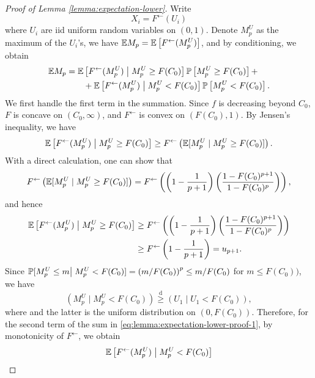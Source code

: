 \begin{proof}[Proof of Lemma \ref{lemma:expectation-lower}]
Write 
$$
X_i = F^{\leftarrow}(U_i)
$$
where $U_i$ are iid uniform random variables on $(0,1)$.
Denote $M^{U}_p$ as the maximum of the $U_i$'s, we have $\E M_p = \E\left[F^{\leftarrow}(M^{U}_p)\right]$, and by conditioning, we obtain
\begin{align} \label{eq:lemma:expectation-lower-proof-1}
    \E M_p &= \E\left[F^{\leftarrow}(M^{U}_p)\;\big|\;M^{U}_p \ge F(C_0)\right] \P\left[M^{U}_p \ge F(C_0)\right] + \nonumber \\ 
           &\quad\quad +\E\left[F^{\leftarrow}(M^{U}_p)\;\big|\;M^{U}_p < F(C_0)\right] \P\left[M^{U}_p < F(C_0)\right]. 
\end{align} 
We first handle the first term in the summation. Since $f$ is decreasing beyond $C_0$, $F$ is concave on $(C_0, \infty)$, and $F^{\leftarrow}$ is convex on $(F(C_0), 1)$. By Jensen's inequality, we have
\begin{equation*}
    \E\left[F^{\leftarrow}(M^{U}_p)\;\big|\;M^{U}_p \ge F(C_0)\right] 
        \ge F^{\leftarrow}\left(\E[M^{U}_p\;|\;M^{U}_p\ge F(C_0)]\right).
\end{equation*}
With a direct calculation, one can show that 
\begin{equation*}
    F^{\leftarrow}\left(\E[M^{U}_p\;|\;M^{U}_p\ge F(C_0)]\right)
    = F^{\leftarrow}\left(\left(1-\frac{1}{p+1}\right)\left(\frac{1-F(C_0)^{p+1}}{1-F(C_0)^{p}}\right)\right),
\end{equation*}
and hence
\begin{align*}
    \E\left[F^{\leftarrow}(M^{U}_p)\;\big|\;M^{U}_p \ge F(C_0)\right] 
        &\ge F^{\leftarrow}\left(\left(1-\frac{1}{p+1}\right)\left(\frac{1-F(C_0)^{p+1}}{1-F(C_0)^{p}}\right)\right) \\
        &\ge F^{\leftarrow}\left(1-\frac{1}{p+1}\right) = u_{p+1}.
\end{align*}
Since $\P[M^{U}_p\le m\big|\;M^{U}_p < F(C_0)] = \left(m/F(C_0)\right)^p \le m/F(C_0)$ for $m\le F(C_0))$, we have
$$\left(M^{U}_p\;\big|\;M^{U}_p < F(C_0)\right)\stackrel{\text{d}}{\ge} \left(U_1\;\big|\;U_1 < F(C_0)\right),$$
where and the latter is the uniform distribution on $(0,F(C_0))$.
Therefore, for the second term of the sum in \eqref{eq:lemma:expectation-lower-proof-1}, by monotonicity of $F^{\leftarrow}$, we obtain
\begin{align*}
    \E\left[F^{\leftarrow}(M^{U}_p)\;\big|\;M^{U}_p < F(C_0)\right] 

\end{align*}
\end{proof}
